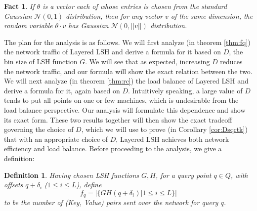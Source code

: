 \documentclass{acm_proc_article-sp}
\numberwithin{equation}{section}
\numberwithin{figure}{section}
\newtheorem{defn}[thm]{Definition}
\newtheorem{fact}[thm]{Fact}
\begin{document}
\begin{fact} \label{fact:2stable} If $\theta$ is a vector each of whose entries is chosen from the standard Gaussian $\mathcal{N}(0,1)$ distribution, then for any vector $v$ of the same dimension, the random variable $ \theta \cdot v$ has Gaussian $\mathcal{N}(0, ||v||)$ distribution.
\end{fact}

The plan for the analysis is as follows. We will first analyze (in theorem \ref{thm:fq}) the network traffic of Layered LSH and derive a formula for it based on $D$, the bin size of LSH function $G$. We will see that as expected, increasing $D$ reduces the network traffic, and our formula will show the exact relation between the two. We will next analyze (in theorem \ref{thm:rc}) the load balance of Layered LSH and derive a formula for it, again based on $D$. Intuitively speaking, a large value of $D$ tends to put all points on one or few machines, which is undesirable from the load balance perspective. Our analysis will formulate this dependence and show its exact form. These two results together will then show the exact tradeoff governing the choice of $D$, which we will use to prove (in Corollary \ref{cor:Dsqrtk}) that with an appropriate choice of $D$, Layered LSH achieves both network efficiency and load balance. Before proceeding to the analysis, we give a definition:
\begin{defn}
\label{defn:f} Having chosen LSH functions $G,H$, for a query point $q\in Q$, with offsets $q+\delta_i$ ($1\leq i\leq L$), define
$$f_q = |\{GH(q+\delta_i)| 1\leq i\leq L\}|$$
to be the number of (Key, Value) pairs sent over the network for query $q$.
\end{defn}
\end{document}
